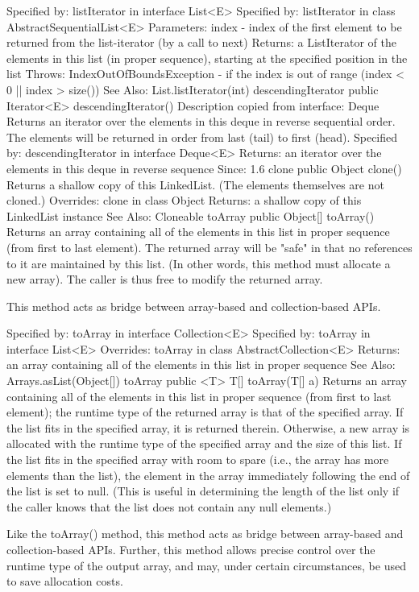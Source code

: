 \documentclass{book}
\begin{document}
Specified by:
listIterator in interface List<E>
Specified by:
listIterator in class AbstractSequentialList<E>
Parameters:
index - index of the first element to be returned from the list-iterator (by a call to next)
Returns:
a ListIterator of the elements in this list (in proper sequence), starting at the specified position in the list
Throws:
IndexOutOfBoundsException - if the index is out of range (index < 0 || index > size())
See Also:
List.listIterator(int)
descendingIterator
public Iterator<E> descendingIterator()
Description copied from interface: Deque
Returns an iterator over the elements in this deque in reverse sequential order. The elements will be returned in order from last (tail) to first (head).
Specified by:
descendingIterator in interface Deque<E>
Returns:
an iterator over the elements in this deque in reverse sequence
Since:
1.6
clone
public Object clone()
Returns a shallow copy of this LinkedList. (The elements themselves are not cloned.)
Overrides:
clone in class Object
Returns:
a shallow copy of this LinkedList instance
See Also:
Cloneable
toArray
public Object[] toArray()
Returns an array containing all of the elements in this list in proper sequence (from first to last element).
The returned array will be "safe" in that no references to it are maintained by this list. (In other words, this method must allocate a new array). The caller is thus free to modify the returned array.

This method acts as bridge between array-based and collection-based APIs.

Specified by:
toArray in interface Collection<E>
Specified by:
toArray in interface List<E>
Overrides:
toArray in class AbstractCollection<E>
Returns:
an array containing all of the elements in this list in proper sequence
See Also:
Arrays.asList(Object[])
toArray
public <T> T[] toArray(T[] a)
Returns an array containing all of the elements in this list in proper sequence (from first to last element); the runtime type of the returned array is that of the specified array. If the list fits in the specified array, it is returned therein. Otherwise, a new array is allocated with the runtime type of the specified array and the size of this list.
If the list fits in the specified array with room to spare (i.e., the array has more elements than the list), the element in the array immediately following the end of the list is set to null. (This is useful in determining the length of the list only if the caller knows that the list does not contain any null elements.)

Like the toArray() method, this method acts as bridge between array-based and collection-based APIs. Further, this method allows precise control over the runtime type of the output array, and may, under certain circumstances, be used to save allocation costs.
\end{document}
